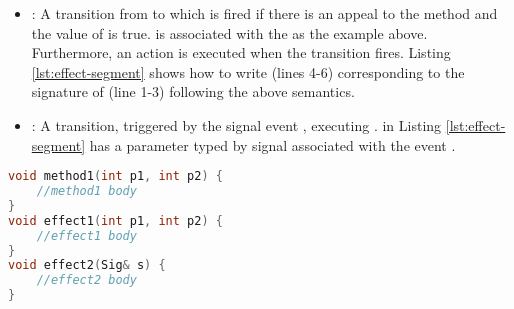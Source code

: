 \noindent
{}
\begin{itemize}[\footnotesize]
\item {}: A transition from  to  which is fired if there is an appeal to the method  and the value of  is true.
 is associated with the  as the example above.
Furthermore, an action  is executed when the transition fires.
Listing \ref{lst:effect-segment} shows how to write  (lines 4-6) corresponding to the signature of  (line 1-3) following the above semantics.

\item {}: A transition, triggered by the signal event , executing .
 in Listing \ref{lst:effect-segment} has a parameter typed by signal  associated with the event .
\end{itemize}

\begin{minipage}{1.05\columnwidth}
\begin{lstlisting}[language=C++, caption=A segment of C++ front-end code, label=lst:effect-segment,frame=f]
void method1(int p1, int p2) {
	//method1 body
}
void effect1(int p1, int p2) {
	//effect1 body
}
void effect2(Sig& s) {
	//effect2 body
}
\end{lstlisting}
\end{minipage}